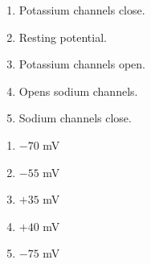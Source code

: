 \begin{enumerate}[label=\textbf{Q2.3.\arabic*}]




            \begin{wordbox}
                  \begin{enumerate}[label=(\alph*)]
                        \item Potassium channels close.
                        \item Resting potential.
                        \item Potassium channels open.
                        \item Opens sodium channels.
                        \item Sodium channels close.
                  \end{enumerate}
            \end{wordbox}
            \begin{enumerate}[label=(\arabic*)]
                  \item \(-70\) mV \quad \dotfill \quad {}\\
                  \item \(-55\) mV \quad \dotfill \quad {}\\
                  \item \(+35\) mV \quad \dotfill \quad {}\\
                  \item \(+40\) mV \quad \dotfill \quad {}\\
                  \item \(-75\) mV \quad \dotfill \quad {}
            \end{enumerate}

\newpage
      




\end{enumerate}
